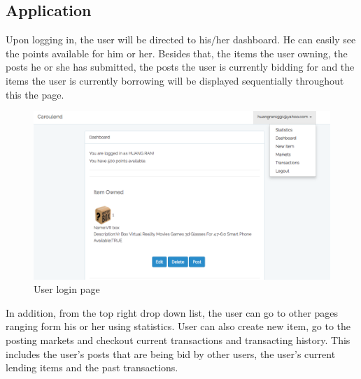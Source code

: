 \subsection{Application}
Upon logging in, the user will be directed to his/her dashboard. He can easily see the points available for him or her. Besides that, the items the user owning, the posts he or she has submitted, the posts the user is currently bidding for and the items the user is currently borrowing will be displayed sequentially throughout this the page.\\
\begin{figure}[h]
      \centering
	\includegraphics[scale=0.3]{dashboard.png}
      \caption{User login page}
\end{figure}
In addition, from the top right drop down list, the user can go to other pages ranging form his or her using statistics. User can also create new item, go to the posting markets and checkout current transactions and transacting history. This includes the user's posts that are being bid by other users, the user's current lending items and the past transactions.

